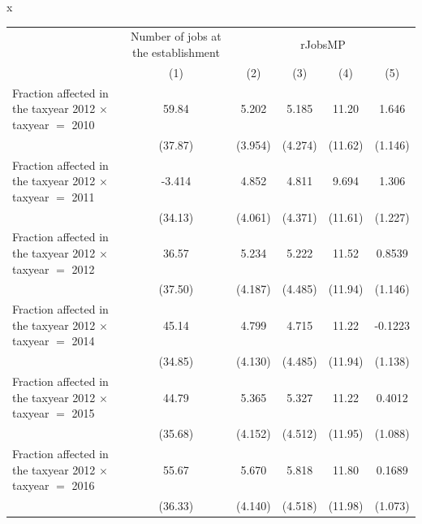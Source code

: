 x
\begingroup
\centering
\begin{tabular}{lccccc}
   \toprule
    & Number of jobs at the establishment & \multicolumn{4}{c}{rJobsMP}\\
                                                                    & (1)           & (2)           & (3)           & (4)           & (5)\\  
   \midrule 
   Fraction affected in the taxyear 2012 $\times$ taxyear $=$ 2010  & 59.84         & 5.202         & 5.185         & 11.20         & 1.646\\   
                                                                    & (37.87)       & (3.954)       & (4.274)       & (11.62)       & (1.146)\\   
   Fraction affected in the taxyear 2012 $\times$ taxyear $=$ 2011  & -3.414        & 4.852         & 4.811         & 9.694         & 1.306\\   
                                                                    & (34.13)       & (4.061)       & (4.371)       & (11.61)       & (1.227)\\   
   Fraction affected in the taxyear 2012 $\times$ taxyear $=$ 2012  & 36.57         & 5.234         & 5.222         & 11.52         & 0.8539\\   
                                                                    & (37.50)       & (4.187)       & (4.485)       & (11.94)       & (1.146)\\   
   Fraction affected in the taxyear 2012 $\times$ taxyear $=$ 2014  & 45.14         & 4.799         & 4.715         & 11.22         & -0.1223\\   
                                                                    & (34.85)       & (4.130)       & (4.485)       & (11.94)       & (1.138)\\   
   Fraction affected in the taxyear 2012 $\times$ taxyear $=$ 2015  & 44.79         & 5.365         & 5.327         & 11.22         & 0.4012\\   
                                                                    & (35.68)       & (4.152)       & (4.512)       & (11.95)       & (1.088)\\   
   Fraction affected in the taxyear 2012 $\times$ taxyear $=$ 2016  & 55.67         & 5.670         & 5.818         & 11.80         & 0.1689\\   
                                                                    & (36.33)       & (4.140)       & (4.518)       & (11.98)       & (1.073)\\   

\end{tabular}
